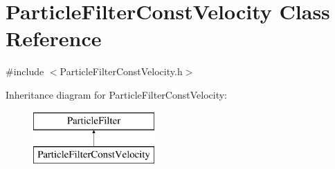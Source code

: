 \hypertarget{classParticleFilterConstVelocity}{}\section{Particle\+Filter\+Const\+Velocity Class Reference}
\label{classParticleFilterConstVelocity}


{\ttfamily \#include $<$Particle\+Filter\+Const\+Velocity.\+h$>$}

Inheritance diagram for Particle\+Filter\+Const\+Velocity\+:\begin{figure}[H]
\begin{center}
\leavevmode
\includegraphics[height=2.000000cm]{classParticleFilterConstVelocity}
\end{center}
\end{figure}
